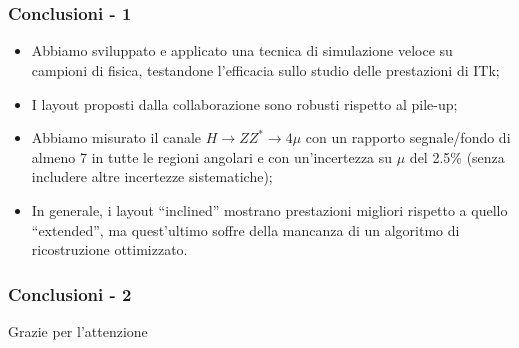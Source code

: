 \documentclass{beamer}
\begin{document}
\section{}
\begin{frame}
\frametitle{Conclusioni - 1}
\begin{itemize}
\item<1-> Abbiamo sviluppato e applicato una tecnica di simulazione veloce
su campioni di fisica, testandone l'efficacia sullo studio delle prestazioni di ITk;
\item<2-> I layout proposti dalla collaborazione sono robusti rispetto al pile-up;
\item<3-> Abbiamo misurato il canale $H \rightarrow ZZ^{*} \rightarrow 4\mu$ con
un rapporto segnale/fondo di almeno 7 in tutte le regioni angolari e con un'incertezza
su $\mu$ del 2.5\% (senza includere altre incertezze sistematiche);
\item<4-> In generale, i layout ``inclined'' mostrano prestazioni migliori rispetto a quello
``extended'', ma quest'ultimo soffre della mancanza di un algoritmo di ricostruzione ottimizzato.
\end{itemize}
\end{frame}

\begin{frame}[label=Conclusions]
\frametitle{Conclusioni - 2}

\bigskip
\bigskip
\bigskip
{} {
\centering
\Large \color{dred} Grazie per l'attenzione
}

\end{frame}
\end{document}
